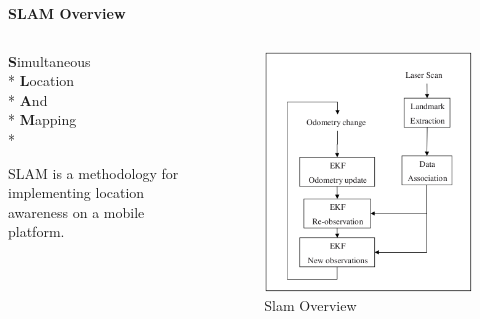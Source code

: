 \documentclass[xcolor=dvipsnames]{beamer}
\begin{document}
  \begin{frame}{\bf SLAM Overview}
    \begin{columns}[t]
      \begin{column}{0.5\textwidth}

        \vspace{1cm}

        {\bf S}imultaneous \\*
        {\bf L}ocation \\*
        {\bf A}nd \\*
        {\bf M}apping \\*

        \vspace{1cm}

        SLAM is a methodology for implementing location awareness on a mobile platform.
      \end{column}
      \begin{column}{0.5\textwidth}
        \begin{figure}
          \begin{center}
            \includegraphics[scale=.3]{slamoverview.png}
          \end{center}
          \caption{Slam Overview \cite{SlamForDummies}}
          \label{fig:slamoverview}
        \end{figure}
      \end{column}
    \end{columns}
  \end{frame}
  
\end{document}
